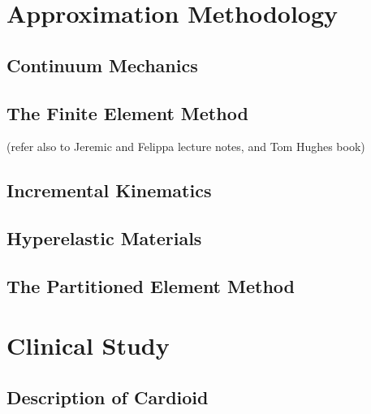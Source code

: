 \documentclass[12pt]{article}
\begin{document}
\section{Approximation Methodology}
\label{Approximation Methodology}

\subsection{Continuum Mechanics}
\label{Continuum Mechanics}
\subsection{The Finite Element Method}
\label{The Finite Element Method}
(refer also to Jeremic and Felippa lecture notes, and Tom Hughes book)
\subsection{Incremental Kinematics}
\label{Incremental Kinematics}
\subsection{Hyperelastic Materials}
\label{Hyperelastic Materials}
\subsection{The Partitioned Element Method}
\label{The Partitioned Element Method}
\newpage
\section{Clinical Study}
\label{Clinical Study}

\subsection{Description of Cardioid}
\label{Description of Cardioid}
\end{document}
